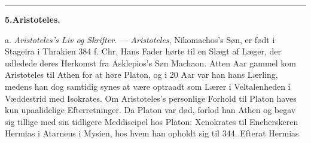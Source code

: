 \documentclass[12pt,a4paper]{book}
\newcommand{\divrule}{\begin{center}\rule{2cm}{0.4pt}\end{center}}
\newcommand{\gk}[1]{\textit{#1}}
\begin{document}
\divrule
\begin{center}
\textbf{5.\enspace Aristoteles.}
\end{center}
a. \emph{Aristoteles's Liv og Skrifter}. --- \emph{Aristoteles},
Nikomachos's Søn, er født i Stageira i Thrakien 384 f. Chr.
Hans Fader hørte til en Slægt af Læger, der udledede deres
Herkomst fra Asklepios's Søn Machaon. Atten Aar gammel
kom Aristoteles til Athen for at høre Platon, og i 20 Aar
var han hans Lærling, medens han dog samtidig synes at
være optraadt som Lærer i Veltalenheden i Væddestrid med
Isokrates. Om Aristoteles's personlige Forhold til Platon haves
kun upaalidelige Efterretninger. Da Platon var død, forlod
han Athen og begav sig tillige med sin tidligere Meddiscipel
hos Platon: Xenokrates til Eneherskeren Hermias i Atarneus
i Mysien, hos hvem han opholdt sig til 344. Efterat Hermias
\end{document}
